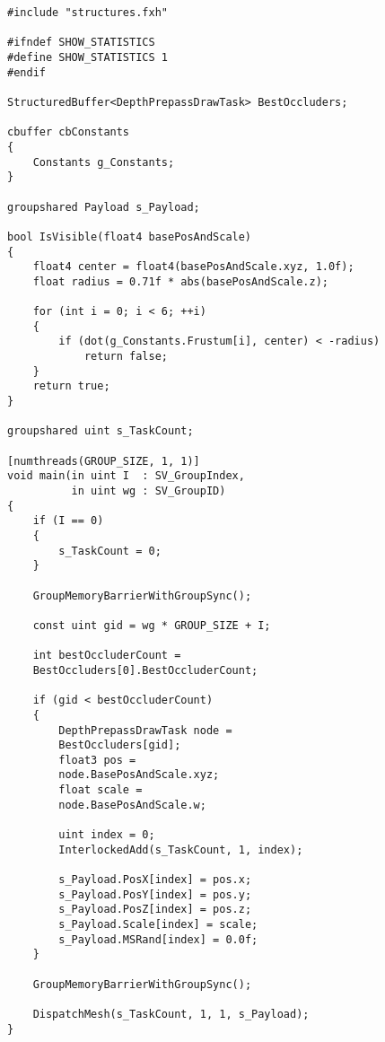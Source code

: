 \begin{lstlisting}
#include "structures.fxh"

#ifndef SHOW_STATISTICS
#define SHOW_STATISTICS 1
#endif

StructuredBuffer<DepthPrepassDrawTask> BestOccluders;

cbuffer cbConstants
{
    Constants g_Constants;
}

groupshared Payload s_Payload;

bool IsVisible(float4 basePosAndScale)
{
    float4 center = float4(basePosAndScale.xyz, 1.0f);
    float radius = 0.71f * abs(basePosAndScale.z);
    
    for (int i = 0; i < 6; ++i)
    {
        if (dot(g_Constants.Frustum[i], center) < -radius)
            return false;
    }
    return true;
}

groupshared uint s_TaskCount;

[numthreads(GROUP_SIZE, 1, 1)]
void main(in uint I  : SV_GroupIndex,
          in uint wg : SV_GroupID)
{
    if (I == 0)
    {
        s_TaskCount = 0;
    }

    GroupMemoryBarrierWithGroupSync();

    const uint gid = wg * GROUP_SIZE + I;
    
    int bestOccluderCount = 
    BestOccluders[0].BestOccluderCount;
    
    if (gid < bestOccluderCount)
    {
        DepthPrepassDrawTask node = 
        BestOccluders[gid];
        float3 pos = 
        node.BasePosAndScale.xyz;
        float scale = 
        node.BasePosAndScale.w;
    
        uint index = 0;
        InterlockedAdd(s_TaskCount, 1, index);

        s_Payload.PosX[index] = pos.x;
        s_Payload.PosY[index] = pos.y;
        s_Payload.PosZ[index] = pos.z;
        s_Payload.Scale[index] = scale;
        s_Payload.MSRand[index] = 0.0f;
    }
    
    GroupMemoryBarrierWithGroupSync();
    
    DispatchMesh(s_TaskCount, 1, 1, s_Payload);
}

\end{lstlisting}


